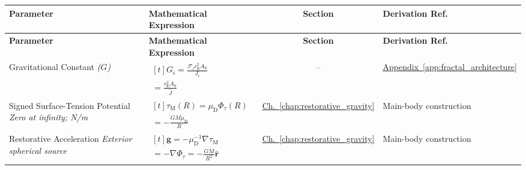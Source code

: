 \vspace{0.5cm}
\noindent
\begin{longtable}{@{} p{4.5cm} p{6cm} c p{4cm} @{}}
\toprule
\textbf{Parameter} & \textbf{Mathematical Expression} & \textbf{Section} & \textbf{Derivation Ref.} \\
\midrule
\endfirsthead
\toprule
\textbf{Parameter} & \textbf{Mathematical Expression} & \textbf{Section} & \textbf{Derivation Ref.} \\
\midrule
\endhead

{\raggedright Gravitational Constant \newline \textit{($G$)}\par} & {\raggedright $\begin{gathered}[t]G_i=\frac{\mathcal F_i c_{\mathrm E}^2A_{\mathrm S}}{J_i} \\ =\frac{c_{\mathrm E}^2A_{\mathrm S}}{\widehat J}\end{gathered}$\par} & -- & {\raggedright \hyperref[app:fractal_architecture]{Appendix~\ref*{app:fractal_architecture}}\par} \\

{\raggedright Signed Surface-Tension Potential \newline \textit{Zero at infinity; N/m}\par} & {\raggedright $\begin{gathered}[t]\tau_{\mathrm M}(R)=\mu_{\mathrm D}\Phi_\tau(R) \\ =-\frac{GM\mu_{\mathrm D}}R\end{gathered}$\par} & \hyperref[chap:restorative_gravity]{Ch.~\ref*{chap:restorative_gravity}} & {\raggedright Main-body construction\par} \\

{\raggedright Restorative Acceleration \newline \textit{Exterior spherical source}\par} & {\raggedright $\begin{gathered}[t]\mathbf g=-\mu_{\mathrm D}^{-1}\nabla\tau_{\mathrm M} \\ =-\nabla\Phi_\tau=-\frac{GM}{R^2}\widehat{\mathbf r}\end{gathered}$\par} & \hyperref[chap:restorative_gravity]{Ch.~\ref*{chap:restorative_gravity}} & {\raggedright Main-body construction\par} \\


\end{longtable}
